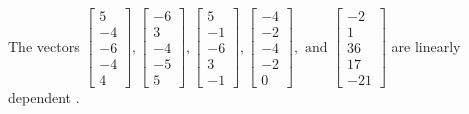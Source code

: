 \begin{exercise}
\begin{exerciseStatement}
  \end{exerciseStatement}
  \begin{exerciseAnswer}
   The vectors \(\left[\begin{array}{r}
5 \\
-4 \\
-6 \\
-4 \\
4
\end{array}\right] , \left[\begin{array}{r}
-6 \\
3 \\
-4 \\
-5 \\
5
\end{array}\right] , \left[\begin{array}{r}
5 \\
-1 \\
-6 \\
3 \\
-1
\end{array}\right] , \left[\begin{array}{r}
-4 \\
-2 \\
-4 \\
-2 \\
0
\end{array}\right] , \text{ and } \left[\begin{array}{r}
-2 \\
1 \\
36 \\
17 \\
-21
\end{array}\right]\) are 
  	 linearly dependent  .
  


  \end{exerciseAnswer}
\end{exercise}